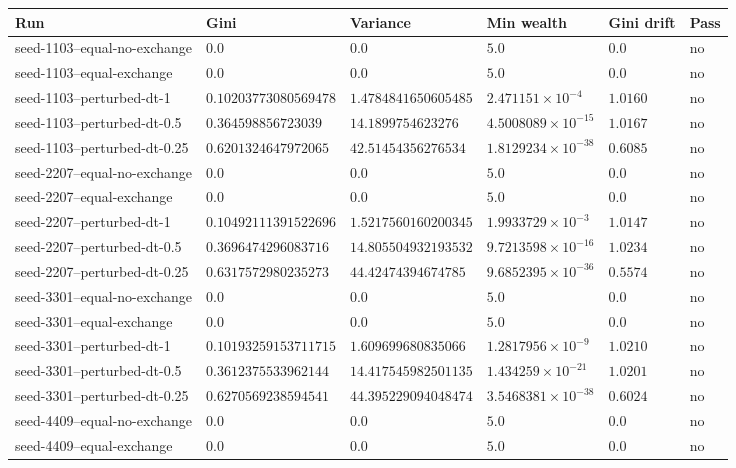 \documentclass[11pt,a4paper]{article}
\begin{document}
\begin{table}[htbp]
\centering
\small
\begin{tabular}{@{}llllll@{}}
\toprule
\textbf{Run} & \textbf{Gini} & \textbf{Variance} & \textbf{Min wealth} & \textbf{Gini drift} & \textbf{Pass} \\
\midrule
seed-1103--equal-no-exchange & $0.0$ & $0.0$ & $5.0$ & $0.0$ & no \\
seed-1103--equal-exchange & $0.0$ & $0.0$ & $5.0$ & $0.0$ & no \\
seed-1103--perturbed-dt-1 & $0.10203773080569478$ & $1.4784841650605485$ & $2.471151\times10^{-4}$ & $1.0160$ & no \\
seed-1103--perturbed-dt-0.5 & $0.364598856723039$ & $14.1899754623276$ & $4.5008089\times10^{-15}$ & $1.0167$ & no \\
seed-1103--perturbed-dt-0.25 & $0.6201324647972065$ & $42.51454356276534$ & $1.8129234\times10^{-38}$ & $0.6085$ & no \\
seed-2207--equal-no-exchange & $0.0$ & $0.0$ & $5.0$ & $0.0$ & no \\
seed-2207--equal-exchange & $0.0$ & $0.0$ & $5.0$ & $0.0$ & no \\
seed-2207--perturbed-dt-1 & $0.10492111391522696$ & $1.5217560160200345$ & $1.9933729\times10^{-3}$ & $1.0147$ & no \\
seed-2207--perturbed-dt-0.5 & $0.3696474296083716$ & $14.805504932193532$ & $9.7213598\times10^{-16}$ & $1.0234$ & no \\
seed-2207--perturbed-dt-0.25 & $0.6317572980235273$ & $44.42474394674785$ & $9.6852395\times10^{-36}$ & $0.5574$ & no \\
seed-3301--equal-no-exchange & $0.0$ & $0.0$ & $5.0$ & $0.0$ & no \\
seed-3301--equal-exchange & $0.0$ & $0.0$ & $5.0$ & $0.0$ & no \\
seed-3301--perturbed-dt-1 & $0.10193259153711715$ & $1.609699680835066$ & $1.2817956\times10^{-9}$ & $1.0210$ & no \\
seed-3301--perturbed-dt-0.5 & $0.3612375533962144$ & $14.417545982501135$ & $1.434259\times10^{-21}$ & $1.0201$ & no \\
seed-3301--perturbed-dt-0.25 & $0.6270569238594541$ & $44.395229094048474$ & $3.5468381\times10^{-38}$ & $0.6024$ & no \\
seed-4409--equal-no-exchange & $0.0$ & $0.0$ & $5.0$ & $0.0$ & no \\
seed-4409--equal-exchange & $0.0$ & $0.0$ & $5.0$ & $0.0$ & no \\

\end{tabular}
\end{table}
\end{document}
